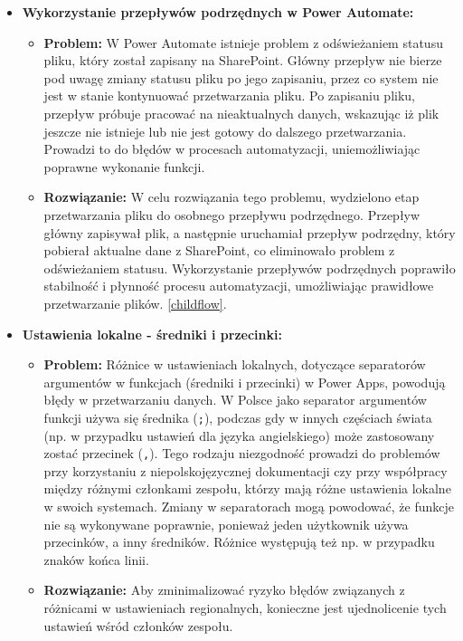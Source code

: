 \begin{itemize}
      \item \textbf{Wykorzystanie przepływów podrzędnych w Power Automate:}
            \begin{itemize}
                  \item \textbf{Problem:} W Power Automate istnieje problem z odświeżaniem statusu pliku, który został zapisany na SharePoint. Główny przepływ nie bierze pod uwagę zmiany statusu pliku po jego zapisaniu, przez co system nie jest w stanie kontynuować przetwarzania pliku. Po zapisaniu pliku, przepływ próbuje pracować na nieaktualnych danych, wskazując iż plik jeszcze nie istnieje lub nie jest gotowy do dalszego przetwarzania. Prowadzi to do błędów w procesach automatyzacji, uniemożliwiając poprawne wykonanie funkcji.
                  \item \textbf{Rozwiązanie:} W celu rozwiązania tego problemu, wydzielono etap przetwarzania pliku do osobnego przepływu podrzędnego. Przepływ główny zapisywał plik, a następnie uruchamiał przepływ podrzędny, który pobierał aktualne dane z SharePoint, co eliminowało problem z odświeżaniem statusu. Wykorzystanie przepływów podrzędnych poprawiło stabilność i płynność procesu automatyzacji, umożliwiając prawidłowe przetwarzanie plików. \ref{childflow}.
            \end{itemize}


      \item \textbf{Ustawienia lokalne - średniki i przecinki:}
            \begin{itemize}
                  \item \textbf{Problem:} Różnice w ustawieniach lokalnych, dotyczące separatorów argumentów w funkcjach (średniki i przecinki) w Power Apps, powodują błędy w przetwarzaniu danych. W Polsce jako separator argumentów funkcji używa się średnika (\texttt{;}), podczas gdy w innych częściach świata (np. w przypadku ustawień dla języka angielskiego) może zastosowany zostać przecinek (\texttt{,}). Tego rodzaju niezgodność prowadzi do problemów przy korzystaniu z niepolskojęzycznej dokumentacji czy przy współpracy między różnymi członkami zespołu, którzy mają różne ustawienia lokalne w swoich systemach. Zmiany w separatorach mogą powodować, że funkcje nie są wykonywane poprawnie, ponieważ jeden użytkownik używa przecinków, a inny średników. Różnice występują też np. w przypadku znaków końca linii.
                  \item \textbf{Rozwiązanie:} Aby zminimalizować ryzyko błędów związanych z różnicami w ustawieniach regionalnych, konieczne jest ujednolicenie tych ustawień wśród członków zespołu.
            \end{itemize}



\end{itemize}
